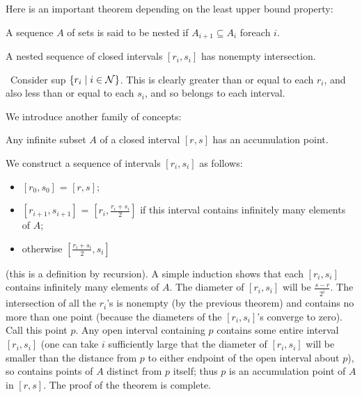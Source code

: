 Here is an important theorem depending on the least upper bound property:

\begin{definition}
 A sequence $A$ of sets is said to be {\upshape nested}
 if $A_{i+1} \subseteq A_i$ for\linebreak each $i$.
\end{definition}

\begin{thm}
 A nested sequence of closed intervals $[r_i,s_i]$ has
 nonempty intersection.
\end{thm}

\preuve\ Consider sup $\{r_i \mid i \in {\cal N}\}$.  This is
clearly greater than or equal to each $r_i$, and also less than or
equal to each $s_i$, and so belongs to each interval.
\finpreuve

We introduce another family of concepts:

\begin{thm}
 Any infinite subset $A$ of a closed interval $[r,s]$ has
 an accumulation point.
\end{thm}

\preuve We construct a sequence of intervals $[r_i,s_i]$ as
follows:
\begin{itemize}
 \item $[r_0,s_0]$ = $[r,s]$;
 \item $[r_{i+1},s_{i+1}]$ =
   $[r_i,\frac{r_i+s_i}2]$ if this interval contains infinitely many
   elements of $A$;
 \item otherwise $[\frac{r_i+s_i}2,s_i]$
\end{itemize}
(this is a
definition by recursion).
A simple
induction shows that each $[r_i,s_i]$
contains infinitely many elements of $A$.  The diameter of $[r_i,s_i]$
will be $\frac{s-r}{2^i}$.  The intersection of all the $r_i$'s is nonempty (by the previous
theorem) and contains no more than one point (because the diameters of
the $[r_i,s_i]$'s converge to zero).  Call this point $p$.  Any open
interval containing $p$ contains some entire interval $[r_i,s_i]$ (one
can take $i$ sufficiently large that the diameter of $[r_i,s_i]$ will
be smaller than the distance from $p$ to either endpoint of the open
interval about $p$), so contains points of $A$ distinct from $p$
itself; thus $p$ is an accumulation point of $A$ in $[r,s]$.  The
proof of the theorem is complete.
\finpreuve

